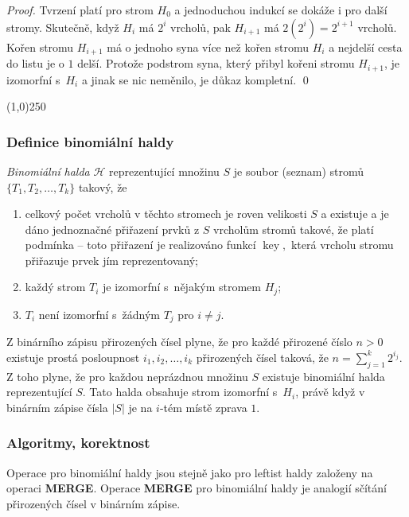 \documentclass[a4paper,12pt]{article}
\newenvironment{myproof}{
  \begin{proof}
    
  }{
  \end{proof}
  \begin{center}
   \line(1,0){250}
   \end{center}
  }
\DeclareMathOperator*{\key}{key}
\begin{document}
\begin{myproof}Tvrzení platí pro strom $H_0$ a 
jednoduchou indukcí se dokáže i pro další stromy. 
Skutečně, když $H_i$ má $2^i$ vrcholů, pak $H_{
i+1}$ má 
$2(2^i)=2^{i+1}$ vrcholů. Kořen stromu $H_{i+1}$ má o jednoho 
syna více než kořen stromu $H_i$ a nejdelší cesta do listu je o $
1$ 
delší. Protože podstrom syna, který přibyl kořeni stromu 
$H_{i+1}$, je izomorfní s~$H_i$ a jinak se nic neměnilo, je 
důkaz kompletní. \qed
\end{myproof}

\subsubsection{Definice binomiální haldy}

\begin{definice}
\emph{Binomiální} \emph{halda} $\mathcal H$ reprezentující 
množinu $S$ je soubor (seznam) stromů $\{T_1,T_2,\dots
,T_k\}$ 
takový, že 
\begin{enumerate}
\item
celkový počet vrcholů v těchto stromech je 
roven velikosti $S$ a 
existuje a je dáno jednoznačné přiřazení prvků 
z $S$ vrcholům stromů takové, že platí 
podmínka  -- toto přiřazení je realizováno 
funkcí 
$\key,$ která vrcholu stromu přiřazuje prvek jím reprezentovaný;
\item
každý strom $T_i$ je izomorfní s~nějakým stromem $H_
j$;
\item
$T_i$ není izomorfní s~žádným $T_j$ pro $i\ne j$.
\end{enumerate}
\end{definice}

Z binárního zápisu přirozených čísel plyne, že 
pro každé přiro\-ze\-né číslo $n>0$ existuje prostá 
posloupnost $i_1,i_2,\dots,i_k$ přiro\-ze\-ných čísel taková, že 
$n=\sum_{j=1}^k2^{i_j}$. Z toho plyne, že pro každou neprázd\-nou 
množinu $S$ existuje binomiální halda repre\-zentující $
S$.
Tato halda obsahuje strom izomorfní s~$H_i$, právě když v 
binárním zápise čísla $|S|$ je na $i$-tém místě zprava $
1$.

\subsubsection{Algoritmy, korektnost}

Operace pro binomiální haldy jsou  
stejně jako pro leftist haldy založeny na ope\-raci {\bf MER\-GE}. Ope\-race 
{\bf MERGE} pro binomiální haldy je analogií sčítání 
přirozených čísel v binár\-ním zápise.
\end{document}
